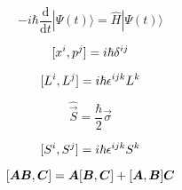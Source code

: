 \begin{equation*}
    -i \hbar \frac{\mathrm{d}}{\mathrm{d}t} |\Psi(t)\rangle = \hat{H} |\Psi(t) \rangle
\end{equation*}


\begin{equation*}
    [x^{i},p^{j}] = i \hbar \delta^{ij}
\end{equation*}

\begin{equation*}
    [L^{i},L^{j}] = i\hbar \epsilon^{ijk}L^{k}
\end{equation*}

\begin{equation*}
    \hat{\vec{S}} = \frac{\hbar}{2} \vec{\sigma}
\end{equation*}

\begin{equation*}
    [S^{i},S^{j}] = i\hbar \epsilon^{ijk}S^{k}
\end{equation*}

\begin{equation*}
    [\boldsymbol{A} \boldsymbol{B},\boldsymbol{C}] = \boldsymbol{A}[\boldsymbol{B},\boldsymbol{C}] + [\boldsymbol{A},\boldsymbol{B}]\boldsymbol{C}
\end{equation*}
